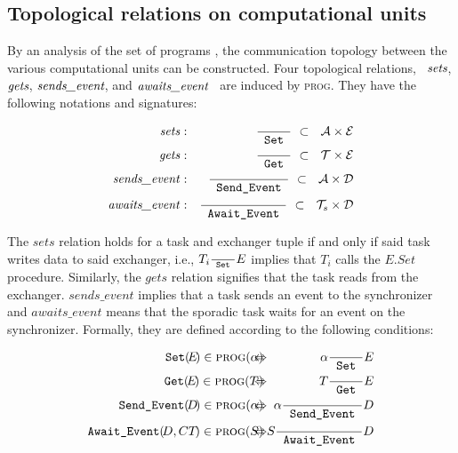\subsection{Topological relations on computational units}
By an analysis of the set of programs , the
communication topology between the various computational units can be
constructed. Four topological relations, \ $\emph{sets}$,
$\emph{gets}$, $\emph{sends\_event}$, and $\emph{awaits\_event}$ \ are
induced by {\scshape prog}. They have the following notations and
signatures:

\begin{eqnarray}
  \text{\emph{sets}} & : & \rset \ \subset\  \ {\cal A} \times {\cal
  E} \\
  \text{\emph{gets}} & : & \rget \ \subset \ \ {\cal T} \times {\cal
  E}  \\
  \text{\emph{sends\_event}} & : &  \rsvt \  \subset \ \ {\cal A}
  \times {\cal D} \\
  \text{\emph{awaits\_event}} & : &  \rgvt \ \subset \ \ {\cal T}_s
  \times {\cal D}
\end{eqnarray}

The $sets$ relation holds for a task and exchanger tuple if and only
if said task writes data to said exchanger, i.e., $T_i \frac{}{\text{\ttfamily\ Set\ }} E$
implies that $T_i$ calls the $E.Set$ procedure. Similarly, the $gets$
relation signifies that the task reads from the
exchanger. $sends\_event$ implies that a task sends an event to the
synchronizer and $awaits\_event$ means that the sporadic task waits
for an event on the synchronizer. Formally, they are defined according
to the following conditions:

\begin{eqnarray}
  \texttt{Set}( \! E \! ) \in \text{\scshape prog}(\alpha) \!\!\!  
   & \!\!\! \Leftrightarrow \!\!\! & \!\!\! \alpha  \rset E  \\
  \texttt{Get}(\! E\!)  \in \text{\scshape prog}(T)  \!\!\!
   & \!\!\! \Leftrightarrow \!\!\! & \!\!\! T \rget E  \\
  \texttt{Send\_Event}(\! D \!) \in \text{\scshape prog}(\alpha) \!\!\! 
   & \!\!\! \Leftrightarrow \!\!\! & \!\!\! \alpha \rsvt D \\
  \texttt{Await\_Event}(\! D, CT \! ) \in \text{\scshape prog}(S) \!\!\!
   & \!\!\! \Leftrightarrow \!\!\! & \!\!\! S \rgvt D
\end{eqnarray}

